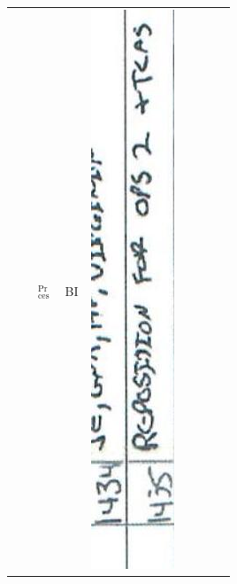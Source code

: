 \documentclass[10pt]{article}
\begin{document}
\begin{center}
\begin{tabular}{|c|c|c|c|c|c|c|c|c|c|c|}
\multirow[t]{3}{*}{} &  & \multirow[t]{3}{*}{\({ }_{\text {ces }}^{\text {Pr }}\)} & BI & \multicolumn{3}{|l|}{\includegraphics[max width=\textwidth]{2025_02_27_dd68c3d38de88f0516d9g-082(3)}
}
\end{tabular}
\end{center}
\end{document}
